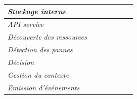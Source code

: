 \begin{table}[h!]
\begin{tabular}{|l|c|c|c|c|c|c|}
		\textit{Stockage interne}                            &                                                                                       &                           & \checkmark                                                                 &                       &                                                                   &                    \\ \hline
		\textit{API service}                                 & \checkmark                                                                            &                           & \checkmark                                                                 &                       &                                                                   &                    \\ \hline
		\hline
		\textit{Découverte des ressources}                   &                                                                                       &                           &                                                                            & \checkmark            &                                                                   &                    \\ \hline
		\textit{Détection des pannes}                        &                                                                                       &                           & \checkmark                                                                 &                       &                                                                   &                    \\ \hline
		\textit{Décision}                                    &                                                                                       &                           &                                                                            & \checkmark            &                                                                   &                    \\ \hline
		\textit{Gestion du contexte}                         &                                                                                       &                           &                                                                            &                       & \checkmark                                                        &                    \\ \hline
		\textit{Emission d'événements}                       &                                                                                       &                           & \checkmark                                                                 &                       &                                                                   & \checkmark         \\ \hline

\end{tabular}
\end{table}
